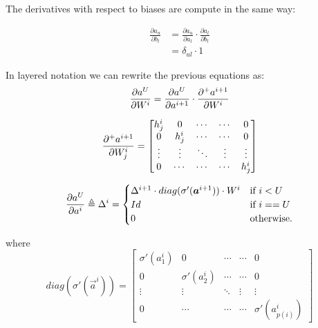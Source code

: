 The derivatives with respect to biases are compute in the same way:

\begin{align}
\frac{\partial a_u}{\partial b_{l}} &= \frac{\partial a_u}{\partial a_l} \cdot \frac{\partial a_l}{\partial b_{l}}\\
&=\delta_{ul} \cdot 1
\end{align}



In layered notation we can rewrite the previous equations as:
\begin{equation}
 \frac{\partial a^U}{\partial W^i} = \frac{\partial a^U}{\partial a^{i+1}} \cdot \frac{\partial^{+} a^{i+1}}{\partial W^i}
\end{equation}


\begin{equation}
\frac{\partial^{+} a^{i+1}}{\partial W_j^i} =
 \begin{bmatrix}
   h_j^{i}    & 0                & \cdots      & \cdots       & 0  \\
   0               & h_j^{i}     & \cdots      & \cdots       & 0  \\
   \vdots          & \vdots           & \ddots      & \vdots       &\vdots\\
   0               & \cdots           & \cdots      & \cdots       & h^{i}_{j}
\end{bmatrix}
\end{equation}

\begin{equation}
\frac{\partial a^U}{\partial a^{i}} \triangleq \Delta^{i} = 
\begin{cases}
      \Delta^{i+1} \cdot diag(\sigma'(\boldsymbol{a}^{i+1})) \cdot W^{i}  & \text{if } i<U\\
      Id & \text{if } i==U\\
    0 & \text{otherwise}.
\end{cases}
\label{fnn_delta}
\end{equation}

where
\begin{equation}
diag(\sigma'(\vec{a}^{i})) =
 \begin{bmatrix}
   \sigma'(a^{i}_1)    & 0                & \cdots      & \cdots       & 0  \\
   0                     & \sigma'(a^{i}_2)     & \cdots      & \cdots       & 0  \\
   \vdots                & \vdots           & \ddots      & \vdots       &\vdots\\
   0                     & \cdots           & \cdots      & \cdots       &\sigma'(a^{i}_{p(i)})
\end{bmatrix}
\end{equation}

